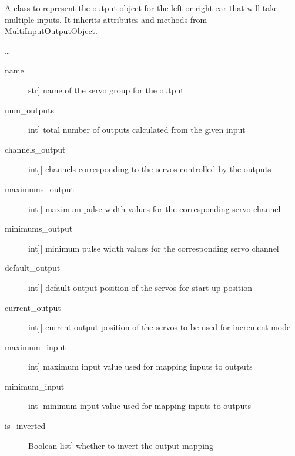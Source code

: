 \documentclass[letterpaper,10pt,english]{sphinxmanual}
\begin{document}
\begin{fulllineitems}
\label{\detokenize{specific:EarOutput.EarOutput}}
\sphinxAtStartPar
A class to represent the output object for the left or right ear that will take multiple inputs.
It inherits attributes and methods from MultiInputOutputObject.

\sphinxAtStartPar
…
\begin{description}
\item[{name}] \leavevmode{[}str{]}
\sphinxAtStartPar
name of the servo group for the output

\item[{num\_outputs}] \leavevmode{[}int{]}
\sphinxAtStartPar
total number of outputs calculated from the given input

\item[{channels\_output}] \leavevmode{[}{[}int{]}{]}
\sphinxAtStartPar
channels corresponding to the servos controlled by the outputs

\item[{maximums\_output}] \leavevmode{[}{[}int{]}{]}
\sphinxAtStartPar
maximum pulse width values for the corresponding servo channel

\item[{minimums\_output}] \leavevmode{[}{[}int{]}{]}
\sphinxAtStartPar
minimum pulse width values for the corresponding servo channel

\item[{default\_output}] \leavevmode{[}{[}int{]}{]}
\sphinxAtStartPar
default output position of the servos for start up position

\item[{current\_output}] \leavevmode{[}{[}int{]}{]}
\sphinxAtStartPar
current output position of the servos to be used for increment mode

\item[{maximum\_input}] \leavevmode{[}int{]}
\sphinxAtStartPar
maximum input value used for mapping inputs to outputs

\item[{minimum\_input}] \leavevmode{[}int{]}
\sphinxAtStartPar
minimum input value used for mapping inputs to outputs

\item[{is\_inverted}] \leavevmode{[}Boolean list{]}
\sphinxAtStartPar
whether to invert the output mapping


\end{description}
\end{fulllineitems}
\end{document}
